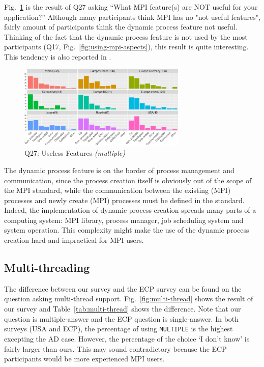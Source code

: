 \documentclass[conference,10pt,letterpaper]{IEEEtran}
\def\myquote#1{`#1'}
\begin{document}
Fig.~\ref{fig:useless-features} is the result of Q27 asking ``What MPI
feature(s) are NOT useful for your application?'' Although many
participants think MPI has no "not useful features", fairly amount of
participants think the dynamic process feature not useful. Thinking
of the fact that the dynamic process feature is not used by the most
participants (Q17, Fig.~\ref{fig:using-mpi-aspects}), this result is
quite interesting.
This tendency is also reported in \cite{10.1145/3295500.3356176}.

\begin{figure}[htb]
  \begin{center}
    \includegraphics[width=8cm]{R-scripts/Q27.pdf}
    \caption{Q27: Useless Features {\it(multiple)}}
    \label{fig:useless-features}
  \end{center}
\end{figure}

The dynamic process feature is on the
border of process management and communication, since the process
creation itself is obviously out of the scope of the MPI standard,
while the communication between the existing (MPI) processes and newly
create (MPI) processes must be defined in the standard. Indeed, the
implementation of dynamic process creation spreads many parts of a
computing system: MPI library, process manager, job scheduling system
and system operation. This complexity might make the use of the
dynamic process creation hard and impractical for MPI users. 

\subsection{Multi-threading}

The difference between our survey and the ECP survey can be found on
the question asking multi-thread support. Fig.~\ref{fig:multi-thread}
shows the result of our survey and Table~\ref{tab:multi-thread} shows
the difference. Note that our question is multiple-answer and the ECP
question is single-answer. In both surveys (USA and ECP), the
percentage of using {\tt MULTIPLE} is the highest excepting the AD
case. However, the percentage of the choice \myquote{I don't know}
is fairly larger than ours. This may sound contradictory because the
ECP participants would be more experienced MPI users.
\end{document}
